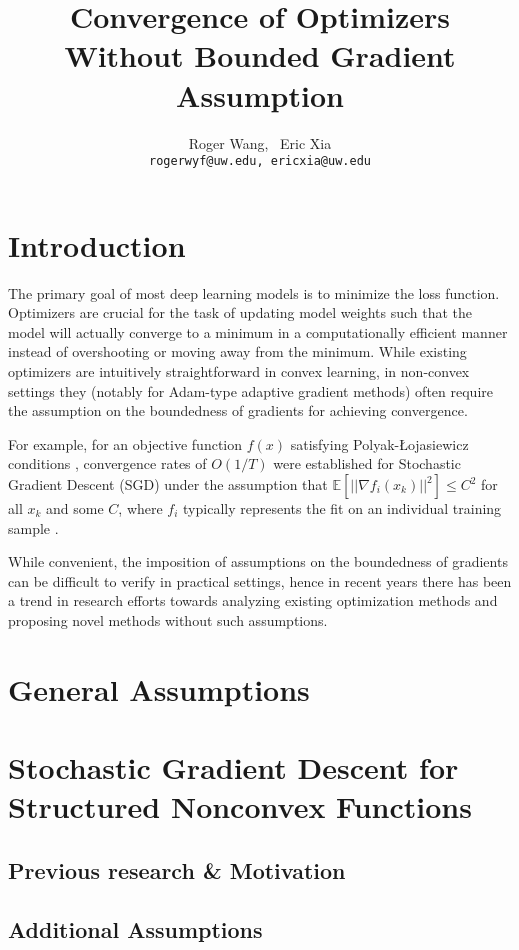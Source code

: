 \documentclass{article}
\title{Convergence of Optimizers Without Bounded Gradient Assumption}
\author{%
  Roger Wang, \ Eric Xia \\
  \texttt{rogerwyf@uw.edu, ericxia@uw.edu} \\
}
\begin{document}
\maketitle


\section{Introduction}

The primary goal of most deep learning models is to minimize the loss function.
Optimizers are crucial for the task of updating model weights such that the model will actually converge to a minimum in a computationally efficient manner instead of overshooting or moving away from the minimum. While existing optimizers are intuitively straightforward in convex learning, in non-convex settings they (notably for Adam-type adaptive gradient methods)
often require the assumption on the boundedness of gradients for achieving convergence.

For example, for an objective function  $f(x)$ satisfying
Polyak-Łojasiewicz conditions \cite{POLYAK1963864},  convergence rates of $O(1/T)$ were established for Stochastic Gradient Descent (SGD) under the assumption that $\mathbb{E}[||\nabla f_i(x_k)||^2] \leq C^2$ for all $x_k$ and some $C$, where $f_i$ typically represents the fit on an individual training sample \cite{DBLP:journals/corr/KarimiNS16}.

While convenient, the imposition of assumptions on the boundedness of gradients can be difficult to verify in practical settings, hence in recent years there has been a trend in research efforts towards analyzing existing optimization methods and proposing novel methods without such assumptions.

\section{General Assumptions}
\newpage
\section{Stochastic Gradient Descent for Structured Nonconvex Functions}
\subsection{Previous research \& Motivation}
\subsection{Additional Assumptions}
\end{document}

